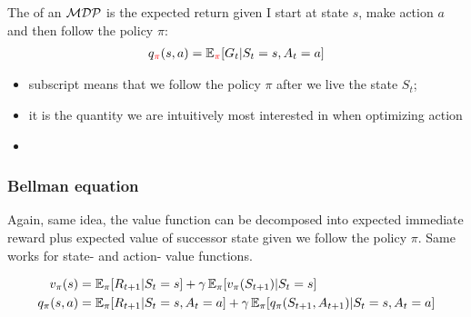 The  of an $\mathcal{MDP}$ is the expected return given I start at state $s$, make action $a$ and then follow the policy $\pi$:
\begin{align}
	q_{\textcolor{red}{\pi}}(s, a) = \operatorname{\mathbb{E}}_{\textcolor{red}{\pi}}[G_t | S_t = s, A_t=a]
\end{align}
\begin{itemize}
	\item subscript \red{$\pi$} means that we follow the policy $\pi$ after we live the state $S_t$;
	\item it is the quantity we are intuitively most interested in when optimizing action
	\item {}
\end{itemize}

\subsubsection{Bellman equation}
Again, same idea, the value function can be decomposed into expected immediate reward plus expected value of successor state given we follow the policy $\pi$. Same works for state- and action- value functions.

\begin{align}
v_\pi(s) 	 &= \operatorname{\mathbb{E}}_\pi[R_{t+1} | S_t = s] + \gamma \operatorname{\mathbb{E}}_\pi[v_{\pi} (S_{t+1})| S_t = s]\\
q_\pi(s, a)	 &= \operatorname{\mathbb{E}}_\pi[R_{t+1} | S_t = s, A_t = a] + \gamma \operatorname{\mathbb{E}}_\pi[ q_{\pi} (S_{t+1}, A_{t+1}) | S_t = s, A_t = a]
\end{align}